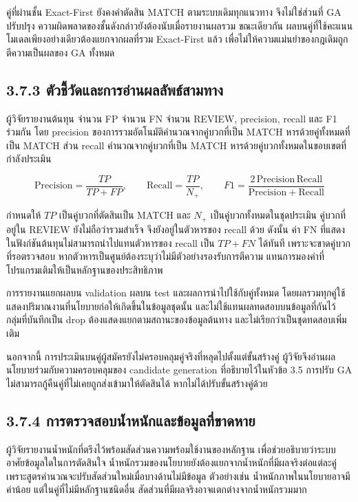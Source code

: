 คู่ที่ผ่านชั้น Exact-First ยังคงคำตัดสิน MATCH ตามระบบเดิมทุกแนวทาง จึงไม่ใช่ส่วนที่ GA ปรับปรุง ความผิดพลาดของชั้นดังกล่าวยังต้องนับเมื่อรายงานผลรวม ขณะเดียวกัน ผลบนคู่ที่ใช้คะแนนโมเดลเพียงอย่างเดียวต้องแยกจากผลที่รวม Exact-First แล้ว เพื่อไม่ให้ความแม่นยำของกฎเดิมถูกตีความเป็นผลของ GA ทั้งหมด

\subsection*{3.7.3 ตัวชี้วัดและการอ่านผลลัพธ์สามทาง}
ผู้วิจัยรายงานต้นทุน จำนวน FP จำนวน FN จำนวน REVIEW, precision, recall และ F1 ร่วมกัน โดย precision ของการรวมอัตโนมัติคำนวณจากคู่บวกที่เป็น MATCH หารด้วยคู่ทั้งหมดที่เป็น MATCH ส่วน recall คำนวณจากคู่บวกที่เป็น MATCH หารด้วยคู่บวกทั้งหมดในขอบเขตที่กำลังประเมิน

\begin{equation*}
\mathrm{Precision}=\frac{TP}{TP+FP},\qquad
\mathrm{Recall}=\frac{TP}{N_+},\qquad
F1=\frac{2\,\mathrm{Precision}\,\mathrm{Recall}}{\mathrm{Precision}+\mathrm{Recall}}
\end{equation*}

กำหนดให้ $TP$ เป็นคู่บวกที่ตัดสินเป็น MATCH และ $N_+$ เป็นคู่บวกทั้งหมดในชุดประเมิน คู่บวกที่อยู่ใน REVIEW ยังไม่ถือว่ารวมสำเร็จ จึงยังอยู่ในตัวหารของ recall ด้วย ดังนั้น ค่า FN ที่แสดงในฟังก์ชันต้นทุนไม่สามารถนำไปแทนตัวหารของ recall เป็น $TP+FN$ ได้ทันที เพราะจะขาดคู่บวกที่รอตรวจสอบ หากตัวหารเป็นศูนย์ต้องระบุว่าไม่มีตัวอย่างรองรับการตีความ แทนการมองค่าที่โปรแกรมเติมให้เป็นหลักฐานของประสิทธิภาพ

การรายงานแยกผลบน validation ผลบน test และผลการนำไปใช้กับคู่ทั้งหมด โดยผลรวมทุกคู่ใช้แสดงปริมาณงานที่นโยบายก่อให้เกิดขึ้นในข้อมูลชุดนั้น และไม่ใช้แทนผลทดสอบบนข้อมูลที่กันไว้ กลุ่มที่บันทึกเป็น drop ต้องแสดงแยกตามสถานะของข้อมูลต้นทาง และไม่เรียกว่าเป็นชุดทดสอบเพิ่มเติม

นอกจากนี้ การประเมินบนคู่ผู้สมัครยังไม่ครอบคลุมคู่จริงที่หลุดไปตั้งแต่ขั้นสร้างคู่ ผู้วิจัยจึงอ่านผลนโยบายร่วมกับความครอบคลุมของ candidate generation ที่อธิบายไว้ในหัวข้อ 3.5 การปรับ GA ไม่สามารถกู้คืนคู่ที่ไม่เคยถูกส่งเข้ามาให้ตัดสินได้ หากไม่ได้ปรับขั้นสร้างคู่ด้วย

\subsection*{3.7.4 การตรวจสอบน้ำหนักและข้อมูลที่ขาดหาย}
ผู้วิจัยรายงานน้ำหนักที่ตรึงไว้พร้อมสัดส่วนความพร้อมใช้งานของหลักฐาน เพื่อช่วยอธิบายว่าระบบอาศัยข้อมูลใดในการตัดสินใจ น้ำหนักรวมของนโยบายยังต้องแยกจากน้ำหนักที่มีผลจริงต่อแต่ละคู่ เพราะสูตรคำนวณจะปรับสัดส่วนใหม่เมื่อบางด้านไม่มีข้อมูล ตัวอย่างเช่น น้ำหนักภาพในนโยบายอาจมีค่าน้อย แต่ในคู่ที่ไม่มีหลักฐานชนิดอื่น สัดส่วนที่มีผลจริงอาจแตกต่างจากน้ำหนักรวมมาก

